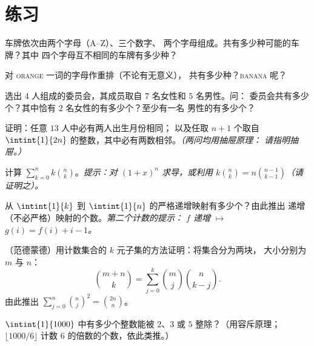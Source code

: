 \section{练习}

\begin{exercise}[$\star$]\label{exo:b1:counting:1}
车牌依次由两个字母（A--Z）、三个数字、
两个字母组成。共有多少种可能的车牌？其中
四个字母互不相同的车牌有多少种？
\end{exercise}

\begin{exercise}[$\star$]\label{exo:b1:counting:2}
对 \textsc{orange} 一词的字母作重排（不论有无意义），
共有多少种？\textsc{banana} 呢？
\end{exercise}

\begin{exercise}[$\star$]\label{exo:b1:counting:3}
选出 $4$ 人组成的委员会，其成员取自 $7$ 名女性和 $5$ 名男性。问：
委员会共有多少个？其中恰有 $2$ 名女性的有多少个？至少有一名
男性的有多少个？
\end{exercise}

\begin{exercise}[$\star$]\label{exo:b1:counting:4}
证明：任意 $13$ 人中必有两人出生月份相同；
以及任取 $n + 1$ 个取自 $\intint{1}{2n}$ 的整数，其中必有两数相邻。\emph{（两问均用抽屉原理：
请指明抽屉。）}
\end{exercise}

\begin{exercise}[$\star$]\label{exo:b1:counting:5}
计算 $\sum_{k=0}^{n} k \binom{n}{k}$。\emph{提示：对
$(1 + x)^n$ 求导，或利用 $k \binom nk = n \binom{n-1}{k-1}$（请证明之）。}
\end{exercise}

\begin{exercise}[$\star\star$]\label{exo:b1:counting:6}
从 $\intint{1}{k}$ 到 $\intint{1}{n}$ 的严格递增映射有多少个？由此推出
递增（不必严格）映射的个数。\emph{第二个计数的提示：
$f$ 递增 $\mapsto$ $g(i) = f(i) + i - 1$。}
\end{exercise}

\begin{exercise}[$\star\star$]\label{exo:b1:counting:7}
（范德蒙德）用计数集合的 $k$ 元子集的方法证明：将集合分为两块，
大小分别为 $m$ 与 $n$：
\[
\binom{m+n}{k} = \sum_{j=0}^{k} \binom{m}{j} \binom{n}{k-j} .
\]
由此推出 $\sum_{j=0}^{n} \binom nj^2 = \binom{2n}{n}$。
\end{exercise}

\begin{exercise}[$\star\star$]\label{exo:b1:counting:8}
$\intint{1}{1000}$ 中有多少个整数能被
$2$、$3$ 或 $5$ 整除？（用容斥原理；$\lfloor 1000/6 \rfloor$
计数 $6$ 的倍数的个数，依此类推。）
\end{exercise}


